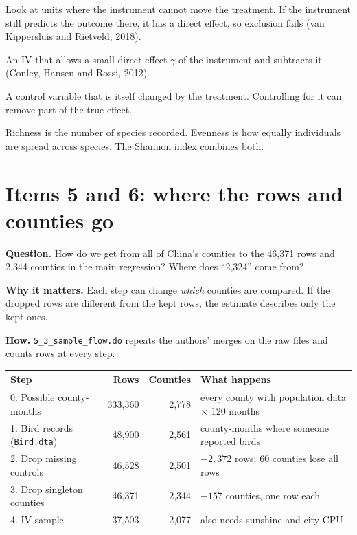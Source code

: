 \documentclass[11pt]{article}
\begin{document}
\begin{termbox}
\begin{description}[leftmargin=0pt,itemsep=2pt,font=\normalfont\bfseries]
\item[Zero-first-stage test.] Look at units where the instrument cannot move the treatment. If the instrument still predicts the outcome there, it has a direct effect, so exclusion fails (van Kippersluis and Rietveld, 2018).
\item[Plausibly exogenous IV.] An IV that allows a small direct effect $\gamma$ of the instrument and subtracts it (Conley, Hansen and Rossi, 2012).
\item[Bad control.] A control variable that is itself changed by the treatment. Controlling for it can remove part of the true effect.
\item[Richness / evenness.] Richness is the number of species recorded. Evenness is how equally individuals are spread across species. The Shannon index combines both.
\end{description}
\end{termbox}

\section{Items 5 and 6: where the rows and counties go}
\textbf{Question.} How do we get from all of China's counties to the 46,371 rows and 2,344 counties in the main regression? Where does ``2,324'' come from?

\textbf{Why it matters.} Each step can change \emph{which} counties are compared. If the dropped rows are different from the kept rows, the estimate describes only the kept ones.

\textbf{How.} \texttt{5\_3\_sample\_flow.do} repeats the authors' merges on the raw files and counts rows at every step.

\begin{center}
\small
\begin{tabular}{l r r l}
\toprule
\textbf{Step} & \textbf{Rows} & \textbf{Counties} & \textbf{What happens} \\
\midrule
0. Possible county-months & 333,360 & 2,778 & every county with population data $\times$ 120 months \\
1. Bird records (\texttt{Bird.dta}) & 48,900 & 2,561 & county-months where someone reported birds \\
2. Drop missing controls & 46,528 & 2,501 & $-2{,}372$ rows; 60 counties lose all rows \\
3. Drop singleton counties & 46,371 & 2,344 & $-157$ counties, one row each \\
4. IV sample & 37,503 & 2,077 & also needs sunshine and city CPU \\
\bottomrule
\end{tabular}
\end{center}
\end{document}
